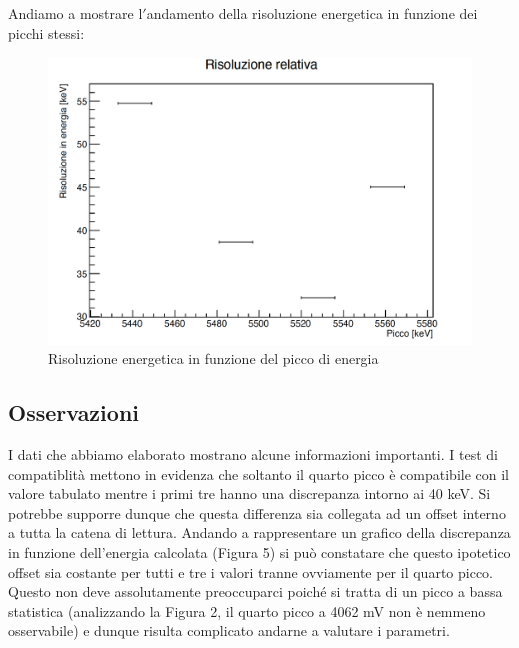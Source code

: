 \documentclass[a4paper,10pt]{article}
\begin{document}
\noindent Andiamo a mostrare l$'$andamento della risoluzione energetica in funzione dei picchi stessi:

\begin{figure}[H]
    \centering
    \includegraphics[scale=0.4]{risoluzione.png}
    \caption{Risoluzione energetica in funzione del picco di energia}
\end{figure}


\subsection{Osservazioni}
I dati che abbiamo elaborato mostrano alcune informazioni importanti. I test di compatiblit\`a mettono in evidenza che soltanto il quarto picco \`e compatibile con il valore tabulato mentre i primi tre hanno una discrepanza intorno ai 40 keV. Si potrebbe supporre dunque che questa differenza sia collegata ad un offset interno a tutta la catena di lettura. Andando a rappresentare un grafico della discrepanza in funzione dell'energia calcolata (Figura 5) si pu\`o constatare che questo ipotetico offset sia costante per tutti e tre i valori tranne ovviamente per il quarto picco. Questo non deve assolutamente preoccuparci poich\'e si tratta di un picco a bassa statistica (analizzando la Figura 2, il quarto picco a 4062 mV non \`e nemmeno osservabile) e dunque risulta complicato andarne a valutare i parametri.
\end{document}

